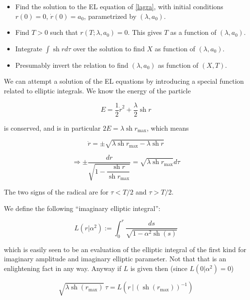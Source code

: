 \documentclass{article}
\newcommand{\rmax}{ r_\text{max} }
\renewcommand{\sinh}{\operatorname{sh}}
\begin{document}
\begin{itemize}
	\item Find the solution to the EL equation of \eqref{lagra}, with initial conditions $r(0) = 0$, $\dot r(0) = a_0$, parametrized by $(\lambda,a_0)$.
	\item Find $T>0$ such that $r(T;\lambda,a_0) = 0$. This gives $T$ as a function of $(\lambda,a_0)$.
	\item Integrate $\int \sinh r  d\tau$ over the solution to find $X$ as function of $(\lambda,a_0)$.
	\item Presumably invert the relation to find $(\lambda,a_0)$ as function of $(X,T)$.
\end{itemize}

We can attempt a solution of the EL equations by introducing a special function related to elliptic integrals. We know the energy of the particle

\begin{equation}
	E = \frac{1}{2} \dot r^2 + \frac{\lambda}{2} \sinh r
	\label{}
\end{equation}

is conserved, and is in particular $2E = \lambda \sinh \rmax $, which means

\begin{equation}
	\dot r = \pm \sqrt{ \lambda \sinh \rmax  - \lambda \sinh r }
	\label{}
\end{equation}

\begin{equation}
	\Rightarrow \pm \frac{dr}{\sqrt{1 - \dfrac{\sinh r }{\sinh \rmax } } } = \sqrt{\lambda \sinh \rmax }d\tau
	\label{separated}
\end{equation}

The two signs of the radical are for $\tau<T/2$ and $\tau>T/2$.

We define the following ``imaginary elliptic integral'':

\begin{equation}
	L(r|\alpha^2) := \int_0^r \frac{ds}{\sqrt{1-\alpha^2 \sinh(s) } }
	\label{}
\end{equation}

which is easily seen to be an evaluation of the elliptic integral of the first kind for imaginary amplitude and imaginary elliptic parameter. Not that that is an enlightening fact in any way. Anyway if $L$ is given then (since $L(0|\alpha^2) = 0$)

\begin{equation}
	\sqrt{\lambda \sinh(\rmax)}\, \tau = L(r \,|\, (\sinh(\rmax))^{-1} ) 
	\label{solution}
\end{equation}
\end{document}
